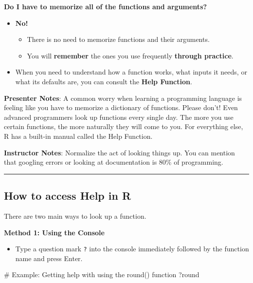 \documentclass[
  letterpaper,
  DIV=11,
  numbers=noendperiod]{scrartcl}
\newenvironment{Shaded}{\begin{snugshade}}{\end{snugshade}}
\newcommand{\CommentTok}[1]{\textcolor[rgb]{0.37,0.37,0.37}{#1}}
\newcommand{\NormalTok}[1]{\textcolor[rgb]{0.00,0.23,0.31}{#1}}
\providecommand{\tightlist}{%
  \setlength{\itemsep}{0pt}\setlength{\parskip}{0pt}}
\begin{document}
\textbf{Do I have to memorize all of the functions and arguments?}

\begin{itemize}
\tightlist
\item
  \textbf{No!}

  \begin{itemize}
  \tightlist
  \item
    There is no need to memorize functions and their arguments.
  \item
    You will \textbf{remember} the ones you use frequently
    \textbf{through practice}.
  \end{itemize}
\item
  When you need to understand how a function works, what inputs it
  needs, or what its defaults are, you can consult the \textbf{Help
  Function}.
\end{itemize}

\textbf{Presenter Notes}: A common worry when learning a programming
language is feeling like you have to memorize a dictionary of functions.
Please don't! Even advanced programmers look up functions every single
day. The more you use certain functions, the more naturally they will
come to you. For everything else, R has a built-in manual called the
Help Function.

\textbf{Instructor Notes}: Normalize the act of looking things up. You
can mention that googling errors or looking at documentation is 80\% of
programming.

\begin{center}\rule{0.5\linewidth}{0.5pt}\end{center}

\subsection{How to access Help in R}\label{how-to-access-help-in-r}

There are two main ways to look up a function.

\textbf{Method 1: Using the Console}

\begin{itemize}
\tightlist
\item
  Type a question mark \texttt{?} into the console immediately followed
  by the function name and press Enter.
\end{itemize}

\begin{Shaded}
\begin{Highlighting}[]
\CommentTok{\# Example: Getting help with using the round() function}
\NormalTok{?round}
\end{Highlighting}
\end{Shaded}
\end{document}
